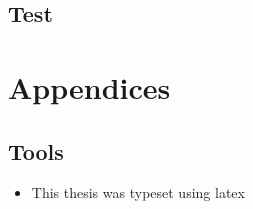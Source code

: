 \documentclass{these-dbl}
\begin{document}
\cite{YangEtAl2022}
\printbibliography%


\chapter{Test}
\cite{AlessioBemporad2009}
\cite{YangEtAl2022}
\printbibliography%


\appendix
\part{Appendices}
\chapter{Tools}
\begin{itemize}
  \item This thesis was typeset using \gls{latex}

\end{itemize}


% 
\end{document}
